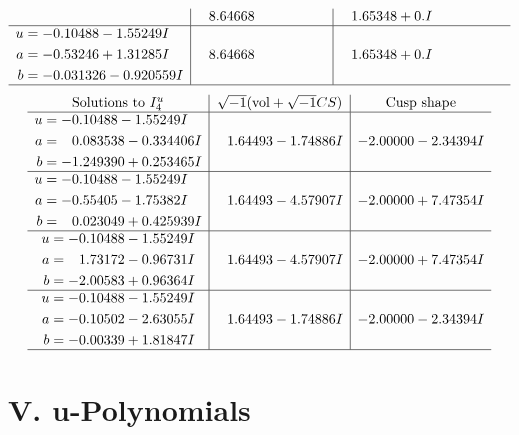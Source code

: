 \documentclass[1p]{elsarticle_modified}
\theoremstyle{definition}
\newcommand{\I}{\sqrt{-1}}
\begin{document}
$$\begin{array}{c|c|c}
 & \phantom{-}8.64668\phantom{ +0.000000I} & \phantom{-}1.65348 + 0. I\phantom{ +0.000000I} \\ \hline\begin{aligned}
u &= -0.10488 - 1.55249 I \\
a &= -0.53246 + 1.31285 I \\
b &= -0.031326 - 0.920559 I\end{aligned}
 & \phantom{-}8.64668\phantom{ +0.000000I} & \phantom{-}1.65348 + 0. I\phantom{ +0.000000I}\\
 \hline 
 \end{array}$$\newpage$$\begin{array}{c|c|c}  
\text{Solutions to }I^u_{4}& \I (\text{vol} + \sqrt{-1}CS) & \text{Cusp shape}\\
 \hline 
\begin{aligned}
u &= -0.10488 - 1.55249 I \\
a &= \phantom{-}0.083538 - 0.334406 I \\
b &= -1.249390 + 0.253465 I\end{aligned}
 & \phantom{-}1.64493 - 1.74886 I & -2.00000 - 2.34394 I \\ \hline\begin{aligned}
u &= -0.10488 - 1.55249 I \\
a &= -0.55405 - 1.75382 I \\
b &= \phantom{-}0.023049 + 0.425939 I\end{aligned}
 & \phantom{-}1.64493 - 4.57907 I & -2.00000 + 7.47354 I \\ \hline\begin{aligned}
u &= -0.10488 - 1.55249 I \\
a &= \phantom{-}1.73172 - 0.96731 I \\
b &= -2.00583 + 0.96364 I\end{aligned}
 & \phantom{-}1.64493 - 4.57907 I & -2.00000 + 7.47354 I \\ \hline\begin{aligned}
u &= -0.10488 - 1.55249 I \\
a &= -0.10502 - 2.63055 I \\
b &= -0.00339 + 1.81847 I\end{aligned}
 & \phantom{-}1.64493 - 1.74886 I & -2.00000 - 2.34394 I\\
 \hline 
 \end{array}$$\newpage
\newpage\renewcommand{\arraystretch}{1}
\centering \section*{ V. u-Polynomials}
\end{document}
